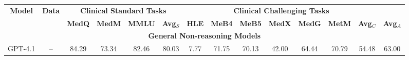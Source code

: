 \documentclass[letterpaper]{article} %
\begin{document}
\begin{table}[!t]
\centering
\small
\begin{adjustbox}{max width=1.0\textwidth}
\begin{tabular}{llcccccccccccc}
\toprule
\multicolumn{1}{c}{\multirow{2}{*}{\textbf{Model}}} & \multicolumn{1}{c}{\multirow{2}{*}{\textbf{Data}}} & \multicolumn{4}{c}{\textbf{Clinical Standard Tasks}}                                                                                             & \multicolumn{7}{c}{\textbf{Clinical Challenging Tasks}}                                                                                                                                                                                                     &                                      \\ \cmidrule(l){3-14}
\multicolumn{1}{c}{}                                & \multicolumn{1}{c}{}                               & \multicolumn{1}{l}{\textbf{MedQ}} & \multicolumn{1}{l}{\textbf{MedM}} & \multicolumn{1}{l}{\textbf{MMLU}} & \multicolumn{1}{l}{\textbf{Avg$_S$}} & \multicolumn{1}{l}{\textbf{HLE}} & \multicolumn{1}{l}{\textbf{MeB4}} & \multicolumn{1}{l}{\textbf{MeB5}} & \multicolumn{1}{l}{\textbf{MedX}} & \multicolumn{1}{l}{\textbf{MedG}} & \multicolumn{1}{l}{\textbf{MetM}} & \multicolumn{1}{l}{\textbf{Avg$_C$}} & \multicolumn{1}{l}{\textbf{Avg$_A$}} \\ \midrule
\multicolumn{14}{c}{\textbf{General Non-reasoning Models}}                                                                                                                                                                                                                                                                                                                                                                                                                                                                                                       \\ \midrule
GPT-4.1                                             & \multicolumn{1}{c}{--}                             & 84.29                             & 73.34                             & 82.46                             & 80.03                                & 7.77                             & 71.75                             & 70.13                             & 42.00                             & 64.44                             & 70.79                             & 54.48                                & 63.00                                \\

\end{tabular}
\end{adjustbox}
\end{table}
\end{document}
